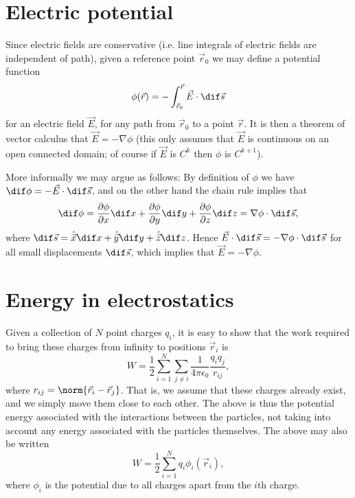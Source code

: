 \documentclass[article, a4paper, 11pt, oneside]{memoir}
\title{\doctitle}
\author{\docauthor}
\numberwithin{equation}{chapter}
\theoremstyle{nonumberplain}
\newcommand{\uvec}[1]{\hat{\vec{#1}}}
\newcommand{\grad}{\nabla}
\begin{document}
\maketitle

\chapter{Electric potential}

Since electric fields are conservative (i.e. line integrals of electric fields are independent of path), given a reference point $\vec{r}_0$ we may define a potential function
%
\begin{equation*}
    \phi(\vec{r})
        = - \int_{\vec{r}_0}^{\vec{r}} \vec{E} \cdot \dif \vec{s}
\end{equation*}
%
for an electric field $\vec{E}$, for any path from $\vec{r}_0$ to a point $\vec{r}$. It is then a theorem of vector calculus that $\vec{E} = - \grad \phi$ (this only assumes that $\vec{E}$ is continuous on an open connected domain; of course if $\vec{E}$ is $C^k$ then $\phi$ is $C^{k+1}$).

More informally we may argue as follows: By definition of $\phi$ we have $\dif \phi = - \vec{E} \cdot \dif \vec{s}$, and on the other hand the chain rule implies that
%
\begin{equation*}
    \dif \phi
        = \frac{\partial \phi}{\partial x} \dif x
          + \frac{\partial \phi}{\partial y} \dif y
          + \frac{\partial \phi}{\partial z} \dif z
        = \grad\phi \cdot \dif\vec{s},
\end{equation*}
%
where $\dif\vec{s} = \uvec{x} \dif x + \uvec{y} \dif y + \uvec{z} \dif z$. Hence $\vec{E} \cdot \dif\vec{s} = -\grad\phi \cdot \dif\vec{s}$ for all small displacements $\dif\vec{s}$, which implies that $\vec{E} = -\grad\phi$.


\chapter{Energy in electrostatics}

Given a collection of $N$ point charges $q_i$, it is easy to show that the work required to bring these charges from infinity to positions $\vec{r}_i$ is
%
\begin{equation*}
    W
        = \frac{1}{2} \sum_{i=1}^N \sum_{j \neq i} \frac{1}{4\pi\epsilon_0} \frac{q_i q_j}{r_{ij}},
\end{equation*}
%
where $r_{ij} = \norm{\vec{r}_i - \vec{r}_j}$. That is, we assume that these charges already exist, and we simply move them close to each other. The above is thus the potential energy associated with the interactions between the particles, not taking into account any energy associated with the particles themselves. The above may also be written
%
\begin{equation*}
    W
        = \frac{1}{2} \sum_{i=1}^N q_i \phi_i(\vec{r}_i),
\end{equation*}
%
where $\phi_i$ is the potential due to all charges apart from the $i$th charge.
\end{document}
